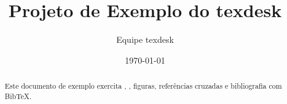 \documentclass[11pt,a4paper]{article}
\title{Projeto de Exemplo do texdesk}
\author{Equipe texdesk}
\date{\today}
\begin{document}
\maketitle

\begin{abstract}
Este documento de exemplo exercita \verb||, \verb||, figuras,
referências cruzadas e bibliografia com Bib\TeX.
\end{abstract}






\end{document}
